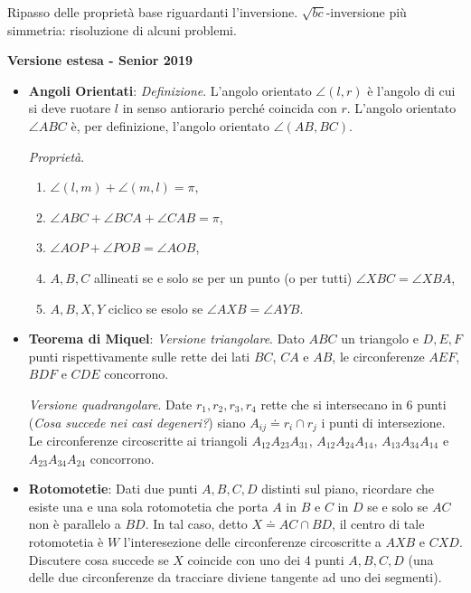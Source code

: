 Ripasso delle proprietà base riguardanti l'inversione. $\sqrt{bc}$-inversione più simmetria: risoluzione di alcuni problemi.

\vspace{0.3cm}
\large{\textbf{Versione estesa - Senior 2019}}\normalsize

\vspace{0.3cm}

\begin{itemize}
	\item \textbf{Angoli Orientati}:
	\emph{Definizione}. L'angolo orientato $\angle(l,r)$ è l'angolo di cui si deve ruotare $l$ in senso antiorario perché coincida con $r$. L'angolo orientato $\angle ABC$ è, per definizione, l'angolo orientato $\angle(AB,BC)$.
	
	\emph{Proprietà}. 
	\begin{enumerate}
		\item $\angle(l,m)+\angle(m,l)=\pi$,
		\item $\angle ABC+\angle BCA+\angle CAB=\pi$,
		\item $\angle AOP + \angle POB=\angle AOB$,
		\item $A,B,C$ allineati se e solo se per un punto (o per tutti) $\angle XBC=\angle XBA$,
		\item $A,B,X,Y$ ciclico se esolo se $\angle AXB=\angle AYB$. 
	\end{enumerate}

	\item \textbf{Teorema di Miquel}:
	\emph{Versione triangolare}. Dato $ABC$ un triangolo e $D,E,F$ punti rispettivamente sulle rette dei lati $BC$, $CA$ e $AB$, le circonferenze $AEF$, $BDF$ e $CDE$ concorrono. 
	
	\emph{Versione quadrangolare}. Date $r_1,r_2,r_3,r_4$ rette che si intersecano in 6 punti (\emph{Cosa succede nei casi degeneri?}) siano $A_{ij}\doteq r_i\cap r_j$ i punti di intersezione. Le circonferenze circoscritte ai triangoli $A_{12}A_{23}A_{31}$, $A_{12}A_{24}A_{14}$, $A_{13}A_{34}A_{14}$ e $A_{23}A_{34}A_{24}$ concorrono.

\item \textbf{Rotomotetie}: Dati due punti $A,B,C,D$ distinti sul piano, ricordare che esiste una e una sola rotomotetia che porta $A$ in $B$ e $C$ in $D$ se e solo se $AC$ non è parallelo a $BD$. In tal caso, detto $X\doteq AC\cap BD$, il centro di tale rotomotetia è $W$ l'interesezione delle circonferenze circoscritte a $AXB$ e $CXD$. Discutere cosa succede se $X$ coincide con uno dei 4 punti $A,B,C,D$ (una delle due circonferenze da tracciare diviene tangente ad uno dei segmenti).


\end{itemize}
